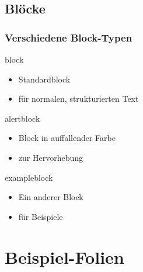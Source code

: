 \documentclass[9pt]{beamer}
\begin{document}
\subsection{Blöcke}
\begin{frame}
  \frametitle{Verschiedene Block-Typen}
  \begin{block}{block}
    \begin{itemize}
      \item Standardblock
      \item für normalen, strukturierten Text
    \end{itemize}
  \end{block}
  \begin{alertblock}{alertblock}
    \begin{itemize}
      \item Block in auffallender Farbe
      \item zur Hervorhebung
    \end{itemize}
  \end{alertblock}
  \begin{exampleblock}{exampleblock}
    \begin{itemize}
      \item Ein anderer Block
      \item für Beispiele
    \end{itemize}
  \end{exampleblock}
\end{frame}

\section{Beispiel-Folien}
\end{document}
